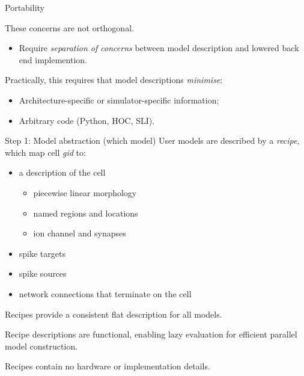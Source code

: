 \documentclass[aspectratio=43]{beamer}
\begin{document}
\begin{frame}[fragile]{Portability}

These concerns are not orthogonal.
\begin{itemize}
    \item Require \emph{separation of concerns} between model description and lowered back end implemention.
\end{itemize}
\vspace{20pt}
Practically, this requires that model descriptions \emph{minimise}:
\begin{itemize}
    \item Architecture-specific or simulator-specific information;
    \item Arbitrary code (Python, HOC, SLI).
\end{itemize}

\end{frame}


\begin{frame}[fragile]{Step 1: Model abstraction (which model)}
    User models are described by a \emph{recipe}, which map cell \emph{gid} to:
    \begin{itemize}
        \item a description of the cell
        \begin{itemize}
            \item piecewise linear morphology
            \item named regions and locations
            \item ion channel and synapses
        \end{itemize}
        \item spike targets
        \item spike sources
        \item network connections that terminate on the cell
    \end{itemize}
    \vspace{5pt}
    Recipes provide a consistent flat description for all models.

    \vspace{5pt}
    Recipe descriptions are functional, enabling lazy evaluation for efficient parallel model construction.

    \vspace{5pt}
    Recipes contain no hardware or implementation details.
\end{frame}
\end{document}
